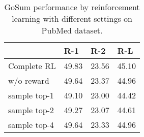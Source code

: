 \begin{table}[t]
  \centering
  \begin{tabular}{l|p{13mm}p{13mm}p{13mm}}\toprule
                    & \hfil R-1  & \hfil R-2  & \hfil R-L    \\ \midrule
        Complete RL                  & \hfil 49.83 & \hfil 23.56 & \hfil 45.10   \\
        \quad w/o reward             & \hfil 49.64 & \hfil 23.37 & \hfil 44.96   \\
        \quad sample top-1          & \hfil 49.10 & \hfil 23.00 & \hfil 44.42   \\
        \quad sample top-2          & \hfil 49.27 & \hfil 23.07 & \hfil 44.61   \\
        \quad sample top-4          & \hfil 49.64 & \hfil 23.33 & \hfil 44.96   \\ \bottomrule
  \end{tabular}
   \caption{ GoSum performance by reinforcement learning with different settings on PubMed dataset.} \label{tab:exp3}
\end{table}

